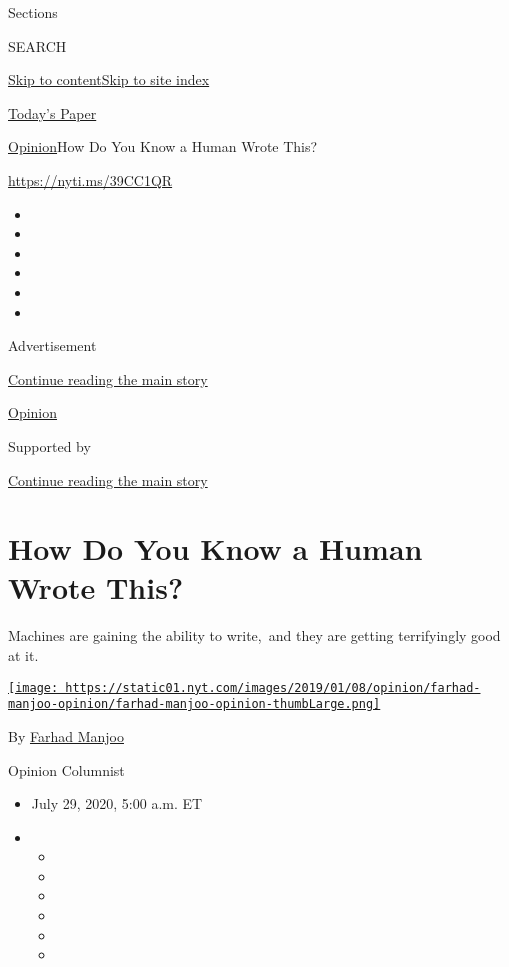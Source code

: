 Sections

SEARCH

\protect\hyperlink{site-content}{Skip to
content}\protect\hyperlink{site-index}{Skip to site index}

\href{https://myaccount.nytimes.com/auth/login?response_type=cookie\&client_id=vi}{}

\href{https://www.nytimes.com/section/todayspaper}{Today's Paper}

\href{/section/opinion}{Opinion}\textbar{}How Do You Know a Human Wrote
This?

\url{https://nyti.ms/39CC1QR}

\begin{itemize}
\item
\item
\item
\item
\item
\item
\end{itemize}

Advertisement

\protect\hyperlink{after-top}{Continue reading the main story}

\href{/section/opinion}{Opinion}

Supported by

\protect\hyperlink{after-sponsor}{Continue reading the main story}

\hypertarget{how-do-you-know-a-human-wrote-this}{%
\section{How Do You Know a Human Wrote
This?}\label{how-do-you-know-a-human-wrote-this}}

Machines are gaining the ability to write,~and they are getting
terrifyingly good at it.

\href{https://www.nytimes.com/by/farhad-manjoo}{\texttt{[image: https://static01.nyt.com/images/2019/01/08/opinion/farhad-manjoo-opinion/farhad-manjoo-opinion-thumbLarge.png]}}

By \href{https://www.nytimes.com/by/farhad-manjoo}{Farhad Manjoo}

Opinion Columnist

\begin{itemize}
\item
  July 29, 2020, 5:00 a.m. ET
\item
  \begin{itemize}
  \item
  \item
  \item
  \item
  \item
  \item
  \end{itemize}
\end{itemize}

